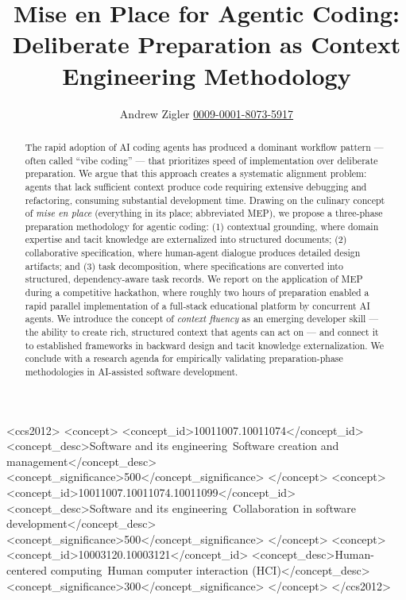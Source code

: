 \documentclass[sigconf]{acmart}
\title{Mise en Place for Agentic Coding: Deliberate Preparation as Context Engineering Methodology}
\author{Andrew Zigler\,\orcidlink{0009-0001-8073-5917}\,\href{https://orcid.org/0009-0001-8073-5917}{0009-0001-8073-5917}}
\affiliation{%
  \institution{LinearB}
  \city{Los Angeles}
  \country{USA}
}
\begin{document}
\begin{abstract}
The rapid adoption of AI coding agents has produced a dominant workflow pattern --- often called ``vibe coding'' --- that prioritizes speed of implementation over deliberate preparation. We argue that this approach creates a systematic alignment problem: agents that lack sufficient context produce code requiring extensive debugging and refactoring, consuming substantial development time. Drawing on the culinary concept of \emph{mise en place} (everything in its place; abbreviated MEP), we propose a three-phase preparation methodology for agentic coding: (1) contextual grounding, where domain expertise and tacit knowledge are externalized into structured documents; (2) collaborative specification, where human-agent dialogue produces detailed design artifacts; and (3) task decomposition, where specifications are converted into structured, dependency-aware task records. We report on the application of MEP during a competitive hackathon, where roughly two hours of preparation enabled a rapid parallel implementation of a full-stack educational platform by concurrent AI agents. We introduce the concept of \emph{context fluency} as an emerging developer skill --- the ability to create rich, structured context that agents can act on --- and connect it to established frameworks in backward design and tacit knowledge externalization. We conclude with a research agenda for empirically validating preparation-phase methodologies in AI-assisted software development.
\end{abstract}

\begin{CCSXML}
<ccs2012>
   <concept>
       <concept_id>10011007.10011074</concept_id>
       <concept_desc>Software and its engineering~Software creation and management</concept_desc>
       <concept_significance>500</concept_significance>
   </concept>
   <concept>
       <concept_id>10011007.10011074.10011099</concept_id>
       <concept_desc>Software and its engineering~Collaboration in software development</concept_desc>
       <concept_significance>500</concept_significance>
   </concept>
   <concept>
       <concept_id>10003120.10003121</concept_id>
       <concept_desc>Human-centered computing~Human computer interaction (HCI)</concept_desc>
       <concept_significance>300</concept_significance>
   </concept>
</ccs2012>
\end{CCSXML}

\end{document}
